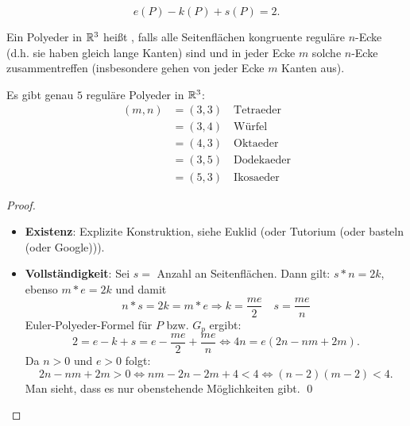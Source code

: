 \begin{deduction}
  \begin{equation*}
    e(P) - k(P) + s(P) = 2\text{.}
  \end{equation*}
\end{deduction}

\begin{definition}
  Ein Polyeder in $ \mathbb{R}^3 $ heißt \label{def:regulaererPolyeder}, falls alle Seitenflächen kongruente reguläre $ n $-Ecke (d.h. sie haben gleich lange Kanten) sind und in jeder Ecke $ m $ solche $ n $-Ecke zusammentreffen (insbesondere gehen von jeder Ecke $ m $ Kanten aus).
\end{definition}

\begin{theorem}
  Es gibt genau $ 5 $ reguläre Polyeder in $ \mathbb{R}^3 $:
  \begin{align*}
    (m,n) &= (3,3) \quad \text{Tetraeder}  \\
     &= (3,4) \quad \text{Würfel} \\
     &= (4,3) \quad \text{Oktaeder} \\
     &= (3,5) \quad \text{Dodekaeder} \\
     &= (5,3) \quad \text{Ikosaeder}
  \end{align*}
  \begin{proof}
    \
    \begin{itemize}
      \item \textbf{Existenz}: Explizite Konstruktion, siehe Euklid (oder Tutorium (oder basteln (oder Google))).
      \item \textbf{Vollständigkeit}: Sei $ s = $ Anzahl an Seitenflächen. Dann gilt: $ s*n = 2k $, ebenso $ m*e = 2k $ und damit
        \begin{equation*}
          n*s = 2k = m*e \Rightarrow k = \frac{me}{2} \quad s = \frac{me}{n}
        \end{equation*}
        Euler-Polyeder-Formel für $ P $ bzw. $ G_p $ ergibt:
        \begin{equation*}
          2 = e-k+s = e - \frac{me}{2} + \frac{me}{n} \Leftrightarrow 4n = e\left( 2n - nm + 2m \right)\text{.}
        \end{equation*}
        Da $ n > 0 $ und $ e > 0 $ folgt:
        \begin{equation*}
          2n - nm + 2m > 0 \Leftrightarrow nm - 2n - 2m + 4 < 4 \Leftrightarrow (n-2)(m-2) < 4\text{.}
        \end{equation*}
        Man sieht, dass es nur obenstehende Möglichkeiten gibt. \qed
    \end{itemize}
  \end{proof}
\end{theorem}

